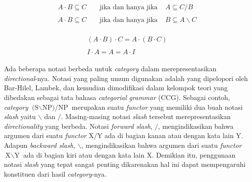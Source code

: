\begin{align}
  \begin{split}\label{catg:syn:4}
    A \cdot B \subseteq C & \;\;\;\;\text{jika dan hanya jika}\;\;\;\; A \subseteq C/B
  \end{split}\\
  \begin{split}\label{catg:syn:5}
    A \cdot B \subseteq C & \;\;\;\;\text{jika dan hanya jika}\;\;\;\; B \subseteq A\backslash{}C
  \end{split}
\end{align}

\begin{align}
  \begin{split}\label{catg:syn:6}
    (A \cdot B) \cdot C = A \cdot (B \cdot C)
  \end{split}\\
  \begin{split}\label{catg:syn:7}
    I \cdot A = A = A \cdot I
  \end{split}
\end{align}

Ada beberapa notasi berbeda untuk \textit{category} dalam merepresentasikan \textit{directional}-nya.
Notasi yang paling umum digunakan adalah  yang dipelopori oleh Bar-Hilel,
Lambek, dan kemudian dimodifikasi dalam kelompok teori yang dibedakan sebagai tata bahasa
 \textit{categorial grammar} (CCG).
Sebagai contoh, \textit{category} $\text{(S$\backslash$NP)/NP}$ merupakan suatu \textit{functor} yang
memiliki dua buah notasi \textit{slash} yaitu $\backslash$ dan $/$.
Masing-masing notasi \textit{slash} tersebut merepresentasikan \textit{directionality} yang berbeda.
Notasi \textit{forward slash}, $/$, mengindikasikan bahwa argumen dari suatu \textit{functor}
$\text{X}/\text{Y}$ ada di bagian kanan atau dengan kata lain $\text{Y}$.
Adapun \textit{backward slash}, $\backslash$, mengindikasikan bahwa argumen dari suatu \textit{functor}
$\text{X}\backslash\text{Y}$ ada di bagian kiri atau dengan kata lain $\text{X}$.
Demikian itu, penggunaan notasi \textit{slash} yang tepat sangat penting dikarenakan hal ini dapat
mempengaruhi konstituen dari hasil  \textit{category}-nya.


